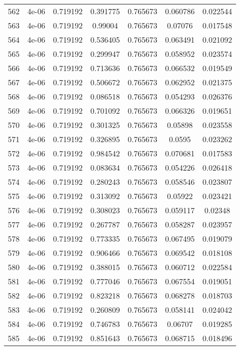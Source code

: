 \begin{table}
\begin{tabular*}{\linewidth}{c|c|c|c|c|c|c}
562 & 4e-06 & 0.719192 & 0.391775 & 0.765673 & 0.060786 & 0.022544\\
563 & 4e-06 & 0.719192 & 0.99004 & 0.765673 & 0.07076 & 0.017548\\
564 & 4e-06 & 0.719192 & 0.536405 & 0.765673 & 0.063491 & 0.021092\\
565 & 4e-06 & 0.719192 & 0.299947 & 0.765673 & 0.058952 & 0.023574\\
566 & 4e-06 & 0.719192 & 0.713636 & 0.765673 & 0.066532 & 0.019549\\
567 & 4e-06 & 0.719192 & 0.506672 & 0.765673 & 0.062952 & 0.021375\\
568 & 4e-06 & 0.719192 & 0.086518 & 0.765673 & 0.054293 & 0.026376\\
569 & 4e-06 & 0.719192 & 0.701092 & 0.765673 & 0.066326 & 0.019651\\
570 & 4e-06 & 0.719192 & 0.301325 & 0.765673 & 0.05898 & 0.023558\\
571 & 4e-06 & 0.719192 & 0.326895 & 0.765673 & 0.0595 & 0.023262\\
572 & 4e-06 & 0.719192 & 0.984542 & 0.765673 & 0.070681 & 0.017583\\
573 & 4e-06 & 0.719192 & 0.083634 & 0.765673 & 0.054226 & 0.026418\\
574 & 4e-06 & 0.719192 & 0.280243 & 0.765673 & 0.058546 & 0.023807\\
575 & 4e-06 & 0.719192 & 0.313092 & 0.765673 & 0.05922 & 0.023421\\
576 & 4e-06 & 0.719192 & 0.308023 & 0.765673 & 0.059117 & 0.02348\\
577 & 4e-06 & 0.719192 & 0.267787 & 0.765673 & 0.058287 & 0.023957\\
578 & 4e-06 & 0.719192 & 0.773335 & 0.765673 & 0.067495 & 0.019079\\
579 & 4e-06 & 0.719192 & 0.906466 & 0.765673 & 0.069542 & 0.018108\\
580 & 4e-06 & 0.719192 & 0.388015 & 0.765673 & 0.060712 & 0.022584\\
581 & 4e-06 & 0.719192 & 0.777046 & 0.765673 & 0.067554 & 0.019051\\
582 & 4e-06 & 0.719192 & 0.823218 & 0.765673 & 0.068278 & 0.018703\\
583 & 4e-06 & 0.719192 & 0.260809 & 0.765673 & 0.058141 & 0.024042\\
584 & 4e-06 & 0.719192 & 0.746783 & 0.765673 & 0.06707 & 0.019285\\
585 & 4e-06 & 0.719192 & 0.851643 & 0.765673 & 0.068715 & 0.018496\\
\end{tabular*}
\end{table}

